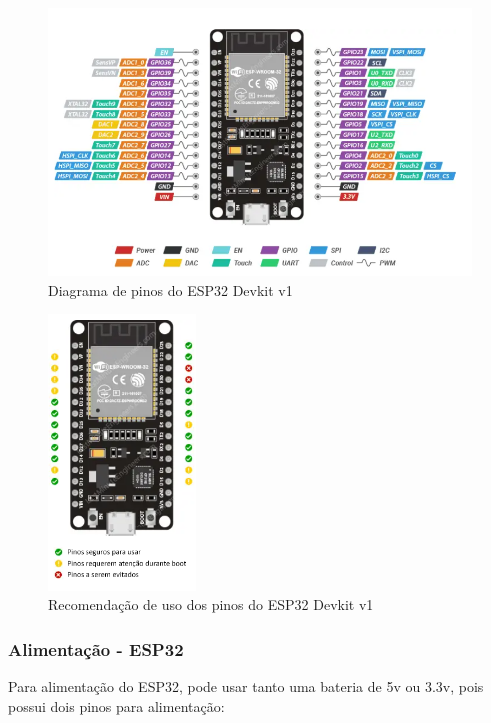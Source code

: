 \begin{figure}[htb]
	\centering
	\includegraphics[width=1.0\textwidth]{figures/esp32_pinout}
	\caption{Diagrama de pinos do ESP32 Devkit v1 \cite{esp32_reference}}
\end{figure}


\begin{figure}[htb]
	\centering
	\includegraphics[width=0.35\textwidth]{figures/esp32_pinout_ref}
	\caption{Recomendação de uso dos pinos do ESP32 Devkit v1 \cite{esp32_reference}}
\end{figure}


\subsubsection{Alimentação - ESP32}

Para alimentação do ESP32, pode usar tanto uma bateria de 5v ou 3.3v, pois possui dois pinos para alimentação: 


